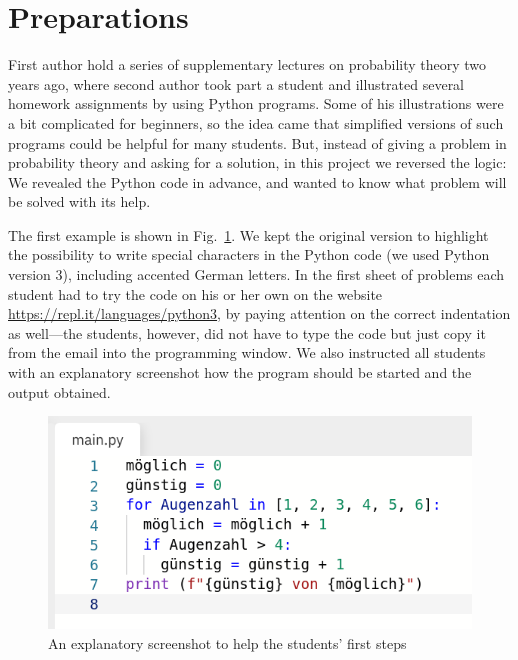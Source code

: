 \documentclass[]{interact}
\theoremstyle{plain}%
\theoremstyle{definition}
\theoremstyle{remark}
\begin{document}
\section{Preparations}
\label{preps}

First author hold a series of supplementary lectures on probability theory two years ago, where second author
took part a student and illustrated several homework assignments by using Python programs.
Some of his illustrations were a bit complicated for beginners, so the idea came that
simplified versions of such programs could be helpful for many students.
But, instead of giving a problem in probability theory and asking for a solution, in this
project we reversed the logic: We revealed the Python code in advance, and wanted to know
what problem will be solved with its help.

%

The first example is shown in Fig.~\ref{main-py-window}. We kept the original version to highlight
the possibility to write special characters in the Python code (we used Python version 3),
including accented German letters. In the first sheet of problems each student had to try
the code on his or her own on the website \url{https://repl.it/languages/python3},
by paying attention on the correct indentation as well---the students, however, did not have
to type the code but just copy it from the email into the programming window.
We also instructed all students with an
explanatory screenshot how the program should be started and the output obtained.

\begin{figure}
\begin{center}\includegraphics[scale=0.5]{../forms/de_AT/main-py-window}
\caption{An explanatory screenshot to help the students' first steps}
\label{main-py-window}
\end{center}
\end{figure}
\end{document}

